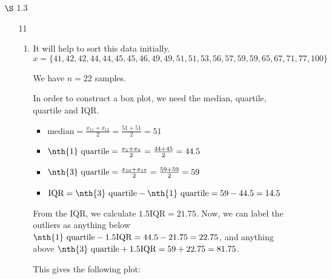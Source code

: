 \documentclass[12pt,letterpaper]{article}
\begin{document}
\begin{enumerate}
    \item [$\S$ 1.3]

      \begin{enumerate}
        \item [11]
          \begin{enumerate}[label=(\arabic*)]
            \item

              It will help to sort this data initially.
              \[
                x = \{41, 42, 42, 44, 44, 45, 45, 46, 49, 49, 51, 51, 53, 56, 57, 59, 59, 65, 67, 71, 77, 100\}
              \]

              We have $n = 22$ samples.

              In order to construct a box plot,
              we need the median,  quartile,  quartile and IQR.

              \begin{itemize}
                \item
                  $\text{median} = \frac{x_{11} + x_{12}}{2} = \frac{51 + 51}{2} = 51$
                \item
                  $\text{\nth{1} quartile} = \frac{x_{5} + x_{6}}{2} = \frac{44 + 45}{2} = 44.5$
                \item
                  $\text{\nth{3} quartile} = \frac{x_{16} + x_{17}}{2} = \frac{59 + 59}{2} = 59$
                \item
                  $\text{IQR} = \text{\nth{3} quartile} - \text{\nth{1} quartile} = 59 - 44.5 = 14.5$
              \end{itemize}
              From the IQR, we calculate $1.5 \text{IQR} = 21.75$.
              Now, we can label the outliers as anything below $\text{\nth{1} quartile} - 1.5\text{IQR} = 44.5 - 21.75 = 22.75$,
              and anything above $\text{\nth{3} quartile} + 1.5\text{IQR} = 59 + 22.75 = 81.75$.

              This gives the following plot:


\end{enumerate}
\end{enumerate}
\end{enumerate}
\end{document}
